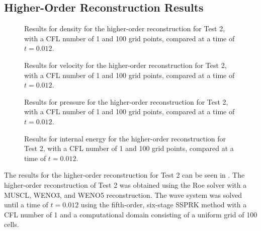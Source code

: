 \subsection{Higher-Order Reconstruction Results}
\begin{figure}
	\caption[Results for density for the higher-order reconstruction for Test 2, with a CFL number of 1 and 100 grid points, compared at a time of $t=0.012$.]{Results for density for the higher-order reconstruction for Test 2, with a CFL number of 1 and 100 grid points, compared at a time of $t=0.012$.}
	\label{fig:Test3HORdensity}
\end{figure}

\begin{figure}
	\caption[Results for velocity for the higher-order reconstruction for Test 2, with a CFL number of 1 and 100 grid points, compared at a time of $t=0.012$.]{Results for velocity for the higher-order reconstruction for Test 2, with a CFL number of 1 and 100 grid points, compared at a time of $t=0.012$.}
	\label{fig:Test3HORvelocity}
\end{figure}

\begin{figure}
	\caption[Results for pressure for the higher-order reconstruction for Test 2, with a CFL number of 1 and 100 grid points, compared at a time of $t=0.012$.]{Results for pressure for the higher-order reconstruction for Test 2, with a CFL number of 1 and 100 grid points, compared at a time of $t=0.012$.}
	\label{fig:Test3HORpressure}
\end{figure}

\begin{figure}
	\caption[Results for internal energy for the higher-order reconstruction for Test 2, with a CFL number of 1 and 100 grid points, compared at a time of $t=0.012$.]{Results for internal energy for the higher-order reconstruction for Test 2, with a CFL number of 1 and 100 grid points, compared at a time of $t=0.012$.}
	\label{fig:Test3HORenergy}
\end{figure}
The results for the higher-order reconstruction for Test 2 can be seen in . The higher-order reconstruction of Test 2 was obtained using the Roe solver with a MUSCL, WENO3, and WENO5 reconstruction. The wave system was solved until a time of $t=0.012$ using the fifth-order, six-stage SSPRK method with a CFL number of 1 and a computational domain consisting of a uniform grid of 100 cells. 

